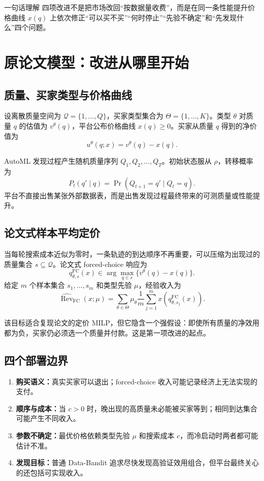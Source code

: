 \documentclass[11pt,a4paper]{ctexart}
\newcommand{\Qset}{\mathcal Q}
\newcommand{\Types}{\Theta}
\newcommand{\Rev}{\operatorname{Rev}}
\begin{document}
\begin{conceptbox}{一句话理解}
四项改进不是把市场改回“按数据量收费”，而是在同一条性能提升价格曲线 $x(q)$ 上依次修正“可以买不买”“何时停止”“先验不确定”和“先发现什么”四个问题。
\end{conceptbox}

\section{原论文模型：改进从哪里开始}

\subsection{质量、买家类型与价格曲线}

设离散质量空间为 $\Qset=\{1,\ldots,Q\}$，买家类型集合为
$\Types=\{1,\ldots,K\}$。类型 $\theta$ 对质量 $q$ 的估值为
$v^\theta(q)$，平台公布价格曲线 $x(q)\ge0$。买家从质量 $q$ 得到的净价值为
\[
u^\theta(q;x)=v^\theta(q)-x(q).
\]

AutoML 发现过程产生随机质量序列
$Q_1,Q_2,\ldots,Q_T$。初始状态服从 $\rho$，转移概率为
\[
P_t(q'\mid q)=\Pr(Q_{t+1}=q'\mid Q_t=q).
\]
平台不直接出售某张外部数据表，而是出售发现过程最终带来的可测质量或性能提升。

\subsection{论文式样本平均定价}

当每轮搜索成本近似为零时，一条轨迹的到达顺序不再重要，可以压缩为出现过的质量集合 $s\subseteq\Qset$。论文式 forced-choice 响应为
\[
q_{\theta,s}^{\mathrm{FC}}(x)
\in\arg\max_{q\in s}\{v^\theta(q)-x(q)\}.
\]
给定 $m$ 个样本集合 $s_1,\ldots,s_m$ 和类型先验 $\mu$，经验收入为
\[
\widehat{\Rev}_{\mathrm{FC}}(x;\mu)
=\sum_{\theta\in\Types}\mu_\theta
  \frac1m\sum_{j=1}^{m}x\!\left(q_{\theta,s_j}^{\mathrm{FC}}(x)\right).
\]

该目标适合复现论文的定价 MILP，但它隐含一个强假设：即使所有质量的净效用都为负，买家仍必须选一个质量并付款。这是第一项改进的起点。

\subsection{四个部署边界}

\begin{enumerate}
  \item \textbf{购买语义：}真实买家可以退出；forced-choice 收入可能记录经济上无法实现的支付。
  \item \textbf{顺序与成本：}当 $c>0$ 时，晚出现的高质量未必能被买家等到；相同到达集合可能产生不同收入。
  \item \textbf{参数不确定：}最优价格依赖类型先验 $\mu$ 和搜索成本 $c$，而冷启动时两者都可能估计不准。
  \item \textbf{发现目标：}普通 Data-Bandit 追求尽快发现高验证效用组合，但平台最终关心的还包括可实现收入。
\end{enumerate}
\end{document}
